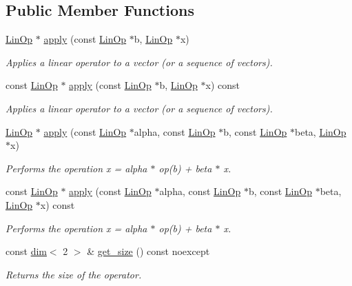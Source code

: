 \subsection*{Public Member Functions}
\begin{DoxyCompactItemize}
\item 
\hyperlink{classgko_1_1LinOp}{Lin\+Op} $\ast$ \hyperlink{classgko_1_1LinOp_a0449b2fc705d2f970855af23b5e2788e}{apply} (const \hyperlink{classgko_1_1LinOp}{Lin\+Op} $\ast$b, \hyperlink{classgko_1_1LinOp}{Lin\+Op} $\ast$x)
\begin{DoxyCompactList}\small\item\em Applies a linear operator to a vector (or a sequence of vectors). \end{DoxyCompactList}\item 
const \hyperlink{classgko_1_1LinOp}{Lin\+Op} $\ast$ \hyperlink{classgko_1_1LinOp_a74afc0e94716dbf4f3e1d7182e37456f}{apply} (const \hyperlink{classgko_1_1LinOp}{Lin\+Op} $\ast$b, \hyperlink{classgko_1_1LinOp}{Lin\+Op} $\ast$x) const
\begin{DoxyCompactList}\small\item\em Applies a linear operator to a vector (or a sequence of vectors). \end{DoxyCompactList}\item 
\hyperlink{classgko_1_1LinOp}{Lin\+Op} $\ast$ \hyperlink{classgko_1_1LinOp_a7203185d7c8d1d9dfe63a39903f0149e}{apply} (const \hyperlink{classgko_1_1LinOp}{Lin\+Op} $\ast$alpha, const \hyperlink{classgko_1_1LinOp}{Lin\+Op} $\ast$b, const \hyperlink{classgko_1_1LinOp}{Lin\+Op} $\ast$beta, \hyperlink{classgko_1_1LinOp}{Lin\+Op} $\ast$x)
\begin{DoxyCompactList}\small\item\em Performs the operation x = alpha $\ast$ op(b) + beta $\ast$ x. \end{DoxyCompactList}\item 
const \hyperlink{classgko_1_1LinOp}{Lin\+Op} $\ast$ \hyperlink{classgko_1_1LinOp_a9bf4bf5dc6118e18f4c9ef1bc782b337}{apply} (const \hyperlink{classgko_1_1LinOp}{Lin\+Op} $\ast$alpha, const \hyperlink{classgko_1_1LinOp}{Lin\+Op} $\ast$b, const \hyperlink{classgko_1_1LinOp}{Lin\+Op} $\ast$beta, \hyperlink{classgko_1_1LinOp}{Lin\+Op} $\ast$x) const
\begin{DoxyCompactList}\small\item\em Performs the operation x = alpha $\ast$ op(b) + beta $\ast$ x. \end{DoxyCompactList}\item 
const \hyperlink{structgko_1_1dim}{dim}$<$ 2 $>$ \& \hyperlink{classgko_1_1LinOp_a31b3c003388eb0b95393154f68c2b98d}{get\+\_\+size} () const noexcept
\begin{DoxyCompactList}\small\item\em Returns the size of the operator. \end{DoxyCompactList}\end{DoxyCompactItemize}


